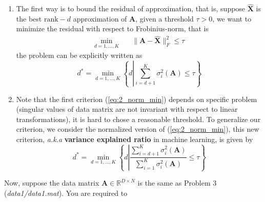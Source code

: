 \documentclass[english,onecolumn]{IEEEtran}
\begin{document}
\begin{enumerate}
    \item The first way is to bound the residual of approximation, that is, suppose $\hat{\mathbf{X}}$ is the best $\mathrm{rank}-d$ approximation of $\mathbf{A}$, given a threshold $\tau>0$, we want to minimize the residual with respect to Frobinius-norm, that is
    \begin{align}
        \min_{d=1,\dots,K}&\quad \|\mathbf{A}-\hat{\mathbf{X}}\|_F^2\leq \tau
    \end{align}
    the problem can be explicitly written as
    \begin{equation}\label{eq:2_norm_min}
        d^*=\min_{d=1,\dots,K}\left\{d\left|\sum_{i=d+1}^K\sigma_{i}^2(\mathbf{A})\leq \tau\right.\right\}
    \end{equation}
    
    \item Note that the first criterion (\ref{eq:2_norm_min}) depends on specific problem (singular values of data matrix are not invariant with respect to linear transformations), it is hard to chose a reasonable threshold. To generalize our criterion, we consider the normalized version of (\ref{eq:2_norm_min}), this new criterion, \textit{a.k.a} \textbf{variance explained ratio} in machine learning, is given by
    \begin{equation}\label{eq:accumulated_error}
        d^*=\min_{d=1,\dots,K}\left\{d\left|\frac{\sum_{i=d+1}^K\sigma_{i}^2(\mathbf{A})}{\sum_{i=1}^K\sigma_i^2(\mathbf{A})}\leq \tau\right.\right\}
    \end{equation}
\end{enumerate}
Now, suppose the data matrix $\mathbf{A}\in\mathbb{R}^{D\times N}$ is the same as {\color{blue} Problem 3} (\emph{data1/data1.mat}). You are required to 
\end{document}
